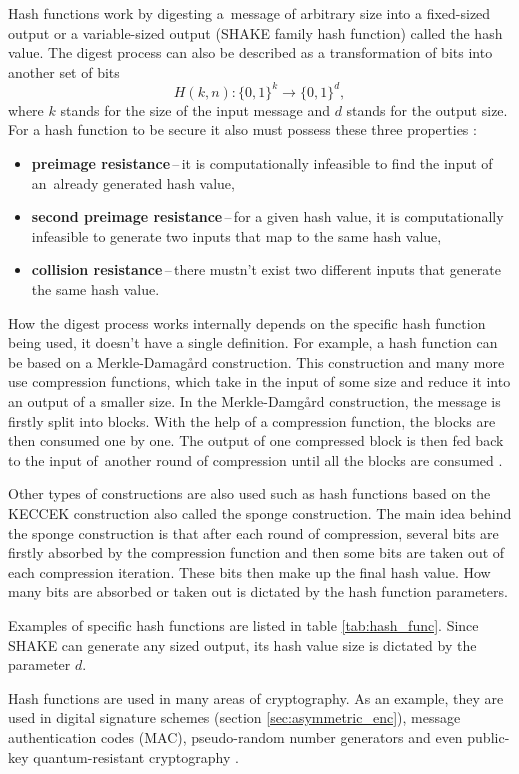 Hash functions work by digesting a~message of arbitrary size into a fixed-sized output or a variable-sized output (SHAKE family hash function) called the hash value. The digest process can also be described as a transformation of bits into another set of bits
\begin{equation}
  H(k, n): \{0,1\}^k \rightarrow \{0,1\}^d,
\end{equation}
where $k$ stands for the size of the input message and $d$ stands for the output size.
\newpage
\noindent For a hash function to be secure it also must possess these three properties \cite{Paar2010}:
\begin{itemize}
  \item \textbf{preimage resistance}\,--\,it is computationally infeasible to find the input of an~already generated hash value,
  \item \textbf{second preimage resistance}\,--\,for a given hash value, it is computationally infeasible to generate two inputs that map to the same hash value,
  \item \textbf{collision resistance}\,--\,there mustn't exist two different inputs that generate the same hash value.
\end{itemize}

How the digest process works internally depends on the specific hash function being used, it doesn't have a single definition. For example, a hash function can be based on a Merkle-Damag\aa rd construction. This construction and many more use compression functions, which take in the input of some size and reduce it into an output of a smaller size. In the Merkle-Damg\aa rd construction, the message is firstly split into blocks. With the help of a compression function, the blocks are then consumed one by one. The output of one compressed block is then fed back to the input of~another round of compression until all the blocks are consumed \cite{Smart2004}.

Other types of constructions are also used such as hash functions based on the KECCEK construction also called the sponge construction. The main idea behind the sponge construction is that after each round of compression, several bits are firstly absorbed by the compression function and then some bits are taken out of each compression iteration. These bits then make up the final hash value. How many bits are absorbed or taken out is dictated by the hash function parameters. \cite{1Od8f4TuMxetfmHu}

Examples of specific hash functions are listed in table \ref{tab:hash_func}. Since SHAKE can generate any sized output, its hash value size is dictated by the parameter $d$.


Hash functions are used in many areas of cryptography. As an example, they are used in digital signature schemes (section \ref{sec:asymmetric_enc}), message authentication codes (\acs{MAC}), pseudo-random number generators and even public-key quantum-resistant cryptography \cite{Chen2016}.
